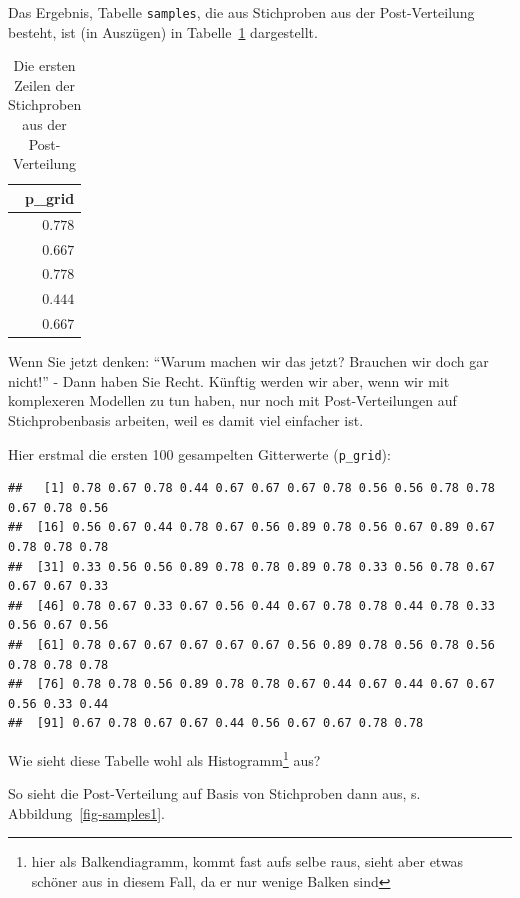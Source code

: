 \documentclass[
  a4paper,
  DIV=11]{scrreprt}
\theoremstyle{definition}
\theoremstyle{remark}
\begin{document}
Das Ergebnis, Tabelle \texttt{samples}, die aus Stichproben aus der
Post-Verteilung besteht, ist (in Auszügen) in
Tabelle~\ref{tbl-postsample1} dargestellt.

\hypertarget{tbl-postsample1}{}
\begin{longtable}{r}
\caption{\label{tbl-postsample1}Die ersten Zeilen der Stichproben aus der Post-Verteilung }\tabularnewline

\toprule
p\_grid \\ 
\midrule
$0.778$ \\ 
$0.667$ \\ 
$0.778$ \\ 
$0.444$ \\ 
$0.667$ \\ 
\bottomrule
\end{longtable}

Wenn Sie jetzt denken: ``Warum machen wir das jetzt? Brauchen wir doch
gar nicht!'' - Dann haben Sie Recht. Künftig werden wir aber, wenn wir
mit komplexeren Modellen zu tun haben, nur noch mit Post-Verteilungen
auf Stichprobenbasis arbeiten, weil es damit viel einfacher ist.

Hier erstmal die ersten 100 gesampelten Gitterwerte (\texttt{p\_grid}):

\begin{verbatim}
##   [1] 0.78 0.67 0.78 0.44 0.67 0.67 0.67 0.78 0.56 0.56 0.78 0.78 0.67 0.78 0.56
##  [16] 0.56 0.67 0.44 0.78 0.67 0.56 0.89 0.78 0.56 0.67 0.89 0.67 0.78 0.78 0.78
##  [31] 0.33 0.56 0.56 0.89 0.78 0.78 0.89 0.78 0.33 0.56 0.78 0.67 0.67 0.67 0.33
##  [46] 0.78 0.67 0.33 0.67 0.56 0.44 0.67 0.78 0.78 0.44 0.78 0.33 0.56 0.67 0.56
##  [61] 0.78 0.67 0.67 0.67 0.67 0.67 0.56 0.89 0.78 0.56 0.78 0.56 0.78 0.78 0.78
##  [76] 0.78 0.78 0.56 0.89 0.78 0.78 0.67 0.44 0.67 0.44 0.67 0.67 0.56 0.33 0.44
##  [91] 0.67 0.78 0.67 0.67 0.44 0.56 0.67 0.67 0.78 0.78
\end{verbatim}

Wie sieht diese Tabelle wohl als Histogramm\footnote{hier als
  Balkendiagramm, kommt fast aufs selbe raus, sieht aber etwas schöner
  aus in diesem Fall, da er nur wenige Balken sind} aus?

So sieht die Post-Verteilung auf Basis von Stichproben dann aus, s.
Abbildung~\ref{fig-samples1}.
\end{document}
